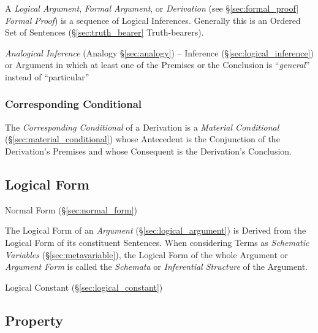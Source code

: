 A \emph{Logical Argument}, \emph{Formal Argument}, or
\emph{Derivation} (see \S\ref{sec:formal_proof} \emph{Formal Proof})
is a sequence of Logical Inferences. Generally this is an Ordered Set
of Sentences (\S\ref{sec:truth_bearer} Truth-bearers).

\fist \emph{Analogical Inference} (Analogy \S\ref{sec:analogy}) -- Inference
(\S\ref{sec:logical_inference}) or Argument in which at least one of the
Premises or the Conclusion is ``\emph{general}'' instead of ``particular''



\subsubsection{Corresponding Conditional}\label{sec:corresponding_conditional}

The \emph{Corresponding Conditional} of a Derivation is a
\emph{Material Conditional} (\S\ref{sec:material_conditional}) whose
Antecedent is the Conjunction of the Derivation's Premises and whose
Consequent is the Derivation's Conclusion.



\subsection{Logical Form}\label{sec:logical_form}

Normal Form (\S\ref{sec:normal_form})

The Logical Form of an \emph{Argument} (\S\ref{sec:logical_argument})
is Derived from the Logical Form of its constituent Sentences. When
considering Terms as \emph{Schematic Variables}
(\S\ref{sec:metavariable}), the Logical Form of the whole Argument or
\emph{Argument Form} is called the \emph{Schemata} or
\emph{Inferential Structure} of the Argument.



Logical Constant (\S\ref{sec:logical_constant})



\subsection{Property}\label{sec:property}


